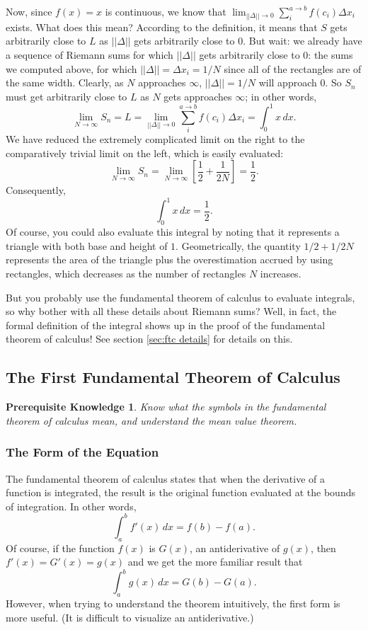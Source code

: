 \documentclass{myarticle}
\theoremstyle{nospace}
\newtheorem*{oldprereq}{Prerequisite Knowledge}
\newenvironment{prereq}
{\begin{mdframed}\begin{oldprereq}}
    {\end{oldprereq}\end{mdframed}}
\newtheorem{old series theorem}{Theorem}
\newenvironment{series theorem}
{\begin{mdframed}\begin{old series theorem}}
    {\end{old series theorem}\end{mdframed}}
\begin{document}
Now, since $f(x) = x$ is continuous, we know that
$\lim_{||\Delta|| \to 0} \sum_i^{a \to b} f(c_i) \Delta x_i$ exists.
What does this mean? According to the definition, it means that $S$
gets arbitrarily close to $L$ as $||\Delta||$ gets arbitrarily close
to $0$. But wait: we already have a sequence of Riemann sums for which
$||\Delta||$ gets arbitrarily close to $0$: the sums we computed
above, for which $||\Delta|| = \Delta x_i = 1/N$ since all of the
rectangles are of the same width. Clearly, as $N$ approaches $\infty$,
$||\Delta|| = 1/N$ will approach $0$. So $S_n$ must get arbitrarily
close to $L$ as $N$ gets approaches $\infty$; in other words,
\[
  \lim_{N \to \infty} S_n
  = L
  = \lim_{||\Delta|| \to 0} \sum_i^{a \to b} f(c_i) \Delta x_i
  = \int_0^1 x \,dx.
\]
We have reduced the extremely complicated limit on the right to the
comparatively trivial limit on the left, which is easily evaluated:
\[
  \lim_{N \to \infty} S_n
  = \lim_{N \to \infty} \left[\frac{1}{2} + \frac{1}{2N}\right]
  = \frac{1}{2}.
\]
Consequently,
\[
  \int_0^1 x \,dx = \frac{1}{2}.
\]
Of course, you could also evaluate this integral by noting that it
represents a triangle with both base and height of $1$. Geometrically,
the quantity $1/2 + 1/2N$ represents the area of the triangle plus the
overestimation accrued by using rectangles, which decreases as the
number of rectangles $N$ increases.

But you probably use the fundamental theorem of calculus to evaluate
integrals, so why bother with all these details about Riemann sums?
Well, in fact, the formal definition of the integral shows up in the
proof of the fundamental theorem of calculus! See section \ref{sec:ftc
  details} for details on this.

\subsection{The First Fundamental Theorem of Calculus}
\label{sec:ftc}

\begin{prereq}
  Know what the symbols in the fundamental theorem of calculus mean,
  and understand the mean value theorem.
\end{prereq}

\subsubsection{The Form of the Equation}
\label{sec:ftc equation}

The fundamental theorem of calculus states that when the derivative of
a function is integrated, the result is the original function
evaluated at the bounds of integration. In other words,
\[
  \int_a^b f'(x) \,dx = f(b) - f(a).
\]
Of course, if the function $f(x)$ is $G(x)$, an antiderivative of
$g(x)$, then $f'(x) = G'(x) = g(x)$ and we get the more familiar
result that
\[
  \int_a^b g(x) \,dx = G(b) - G(a).
\]
However, when trying to understand the theorem intuitively, the first
form is more useful. (It is difficult to visualize an antiderivative.)
\end{document}
